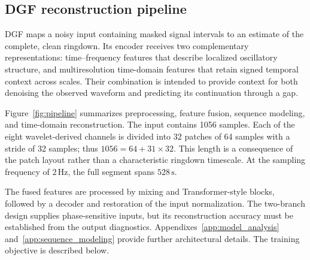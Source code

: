 \documentclass[prd,aps,a4paper,twocolumn,superscriptaddress,nofootinbib,floatfix]{revtex4-2}
\begin{document}
\subsection{DGF reconstruction pipeline}
\label{sec:dgf_overview}

DGF maps a noisy input containing masked signal intervals to an estimate of the complete, clean ringdown. Its encoder receives two complementary representations: time--frequency features that describe localized oscillatory structure, and multiresolution time-domain features that retain signed temporal context across scales. Their combination is intended to provide context for both denoising the observed waveform and predicting its continuation through a gap.

Figure~\ref{fig:pipeline} summarizes preprocessing, feature fusion, sequence modeling, and time-domain reconstruction. The input contains 1056 samples. Each of the eight wavelet-derived channels is divided into 32 patches of 64 samples with a stride of 32 samples; thus $1056=64+31\times32$. This length is a consequence of the patch layout rather than a characteristic ringdown timescale. At the sampling frequency of $2\,\mathrm{Hz}$, the full segment spans $528\,\mathrm{s}$.

The fused features are processed by mixing and Transformer-style blocks, followed by a decoder and restoration of the input normalization. The two-branch design supplies phase-sensitive inputs, but its reconstruction accuracy must be established from the output diagnostics. Appendixes~\ref{app:model_analysis} and~\ref{app:sequence_modeling} provide further architectural details. The training objective is described below.


\end{document}
